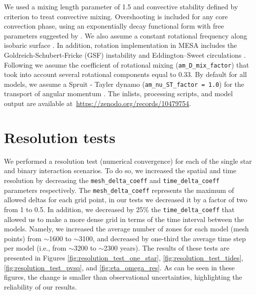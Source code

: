 \documentclass{aa}
\begin{document}
We used a mixing length parameter of 1.5 and convective stability defined by
\citet{Ledoux_1947} criterion to treat convective mixing. Overshooting
is included for any core convection phase, using an exponentially
decay functional form \cite{Herwig_2000} with free parameters
suggested by \cite{claret:18}. We also assume a constant rotational frequency along
isobaric surface \citep{Ekstrom2012}. In addition, rotation
implementation in MESA includes the Goldreich-Schubert-Fricke (GSF)
instability \citep{Heger_2000} and Eddington–Sweet circulations
\citep{Sweet_1950}. Following \citet{Heger_2000} we assume the
coefficient of rotational mixing (\texttt{am\_D\_mix\_factor}) that
took into account several rotational components equal to 0.33.
By default for all models, we assume a Spruit - Tayler dynamo (\texttt{am\_nu\_ST\_factor = 1.0}) for the transport of angular momentum \citep{spruit:02}.
The inlists, processing scripts, and model output are available at~\url{https://zenodo.org/records/10479754}.


\section{Resolution tests}
\label{sec:resolution_test}



We performed a resolution test (numerical convergence) for each of the single star and binary interaction scenarios. To do so, we increased the spatial and time resolution by decreasing the \texttt{mesh\_delta\_coeff} and \texttt{time\_delta\_coeff} parameters respectively.
The \texttt{mesh\_delta\_coeff}  represents the maximum of allowed deltas for each grid point, in our tests we decreased it by a factor of two from 1 to 0.5. In addition, we decreased by 25\% the \texttt{time\_delta\_coeff} that allowed us to make a more dense grid in terms of the time interval between the models.
Namely, we increased the average number of zones for each model (mesh points) from $\sim$1600 to $\sim$3100, and decreased by one-third the average time step per model (i.e., from $\sim$3200 to $\sim$2300 years).
The results of these tests are presented in Figures \ref{fig:resolution_test_one_star}, \ref{fig:resolution_test_tides}, \ref{fig:resolution_test_pvsq}, and \ref{fig:eta_omega_res}. As can be seen in these figures, the change is smaller than observational uncertainties, highlighting the reliability of our results.
\end{document}
